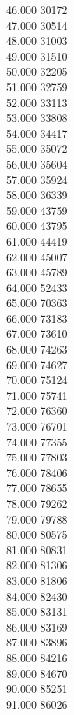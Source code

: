 { 46.000	30172 \\
 47.000	30514 \\
 48.000	31003 \\
 49.000	31510 \\
 50.000	32205 \\
 51.000	32759 \\
 52.000	33113 \\
 53.000	33808 \\
 54.000	34417 \\
 55.000	35072 \\
 56.000	35604 \\
 57.000	35924 \\
 58.000	36339 \\
 59.000	43759 \\
 60.000	43795 \\
 61.000	44419 \\
 62.000	45007 \\
 63.000	45789 \\
 64.000	52433 \\
 65.000	70363 \\
 66.000	73183 \\
 67.000	73610 \\
 68.000	74263 \\
 69.000	74627 \\
 70.000	75124 \\
 71.000	75741 \\
 72.000	76360 \\
 73.000	76701 \\
 74.000	77355 \\
 75.000	77803 \\
 76.000	78406 \\
 77.000	78655 \\
 78.000	79262 \\
 79.000	79788 \\
 80.000	80575 \\
 81.000	80831 \\
 82.000	81306 \\
 83.000	81806 \\
 84.000	82430 \\
 85.000	83131 \\
 86.000	83169 \\
 87.000	83896 \\
 88.000	84216 \\
 89.000	84670 \\
 90.000	85251 \\
 91.000	86026 \\
}
